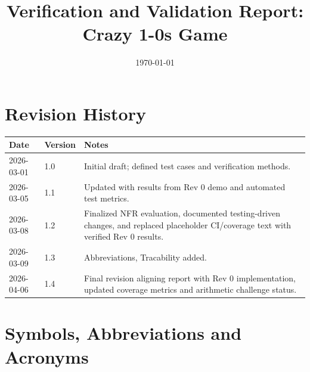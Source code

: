 \documentclass[12pt, titlepage]{article}
\begin{document}
    \title{Verification and Validation Report: Crazy 1-0s Game}
    \author{\authname}
    \date{\today}

    \maketitle


  \tableofcontents

  \newpage

    \section{Revision History}

    \begin{tabularx}{\textwidth}{p{3cm}p{2cm}X}
        \toprule {\bf Date} & {\bf Version} & {\bf Notes}\\
        \midrule
        2026-03-01 & 1.0 & Initial draft; defined test cases and verification methods. \\
        2026-03-05 & 1.1 & Updated with results from Rev 0 demo and automated test metrics. \\
        2026-03-08 & 1.2 & Finalized NFR evaluation, documented testing-driven changes, and replaced placeholder CI/coverage text with verified Rev 0 results. \\
        2026-03-09 & 1.3 & Abbreviations, Tracability added. \\
        2026-04-06 & 1.4 & Final revision aligning report with Rev 0 implementation, updated coverage metrics and arithmetic challenge status. \\
        \bottomrule
    \end{tabularx}

    \newpage

    \section{Symbols, Abbreviations and Acronyms}
\end{document}
